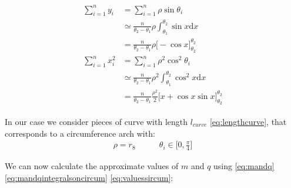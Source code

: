 \begin{itemize}
\begin{itemize}
\begin{align}
\begin{split}
 \sum_{i=1}^{n}{y_i} &= \sum_{i=1}^{n}{\rho\sin{\theta_i}} \\
& \simeq  \frac{n}{\theta_2 - \theta_1}  \rho \int_{\theta_1}^{\theta_2}{\sin{x}\mathrm  {d}x} \\
&= \frac{n}{\theta_2 - \theta_1}  \rho \Big[-\cos{x} \Big]_{\theta_2}^{\theta_2}\\[10pt]
 \sum_{i=1}^{n}{x_i^2} &= \sum_{i=1}^{n}{\rho^2\cos^2{\theta_i}} \\
& \simeq  \frac{n}{\theta_2 - \theta_1}  \rho^2 \int_{\theta_1}^{\theta_2}{\cos^2{x}\mathrm  {d}x} \\
&=  \frac{n}{\theta_2 - \theta_1}  \frac{ \rho^2}{2} \Big[ x+\cos{x} \sin{x}\Big]_{\theta_2}^{\theta_2}
\end{split}
\label{eq:mandqintegralsoncircum}
\end{align}

In our case we consider pieces of curve with length $l_{curve}$ \ref{eq:lengthcurve}, that corresponds to a circumference arch with:
\begin{align}
\rho = r_{8}  \ \ \ \ \ \ \ \ \ \ \ \ \ 
\theta_i \in \Big[0,\frac{\pi}{4}\Big]
\label{eq:valuessircum}
\end{align}

We can now calculate the approximate values of $m$ and $q$ using \ref{eq:mandq} \ref{eq:mandqintegralsoncircum} \ref{eq:valuessircum}:


\end{itemize}
\end{itemize}
